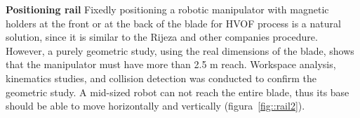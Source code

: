 

\textbf{Positioning rail}
Fixedly positioning a robotic manipulator with magnetic holders at the front or
at the back of the blade for HVOF process is a natural solution, since it is
similar to the Rijeza and other companies procedure. However, a purely geometric
study, using the real dimensions of the blade, shows that the manipulator must
have more than 2.5 m reach. Workspace analysis, kinematics studies, and
collision detection was conducted to confirm the geometric study. A mid-sized
robot can not reach the entire blade, thus its base should be able to move
horizontally and vertically (figura~\ref{fig::rail2}).

